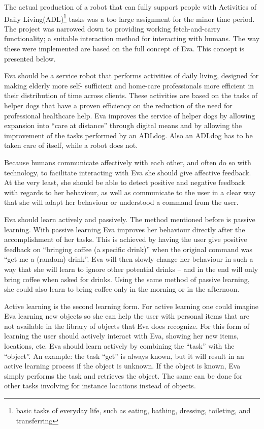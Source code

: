 \documentclass[project_eva.tex]{subfiles}
\begin{document}
The actual production of a robot that can fully support people with Activities of Daily Living(ADL)\footnote{basic tasks of everyday life, such as eating, bathing, dressing, toileting, and transferring}  tasks was a too large assignment for the minor time period. The project was narrowed down to providing working fetch-and-carry functionality; a suitable interaction method for interacting with humans. The way these were implemented are based on the full concept of Eva. This concept is presented below.

Eva should be a service robot that performs activities of daily living, designed for making elderly more self-
sufficient\cite{Forlizzi} and home-care professionals more efficient in their distribution of time across clients. These 
activities are based on the tasks of helper dogs that have a proven efficiency on the reduction of the need for 
professional healthcare help\cite{Diepenhorst}. Eva improves the service of helper dogs by allowing 
expansion into ``care at distance'' \cite{Evers} through digital means and by allowing the improvement of the tasks 
performed by an ADLdog. Also an ADLdog has to be taken care of itself, while a robot does not.

Because humans communicate affectively with each other, and often do so with technology, to facilitate interacting with Eva she should give affective feedback. At the very least, she should be able to detect positive and negative feedback with regards to her behaviour, as well as communicate to the user in a clear way that she will adapt her behaviour or understood a command from the user.

Eva should learn actively and passively. The method mentioned before is passive learning. With passive learning Eva 
improves her behaviour directly after the accomplishment of her tasks. This is achieved by having the user give positive 
feedback on ``bringing coffee (a specific drink)''  when the original command was ``get me a (random) drink''.  Eva will 
then slowly change her behaviour in such a way that she will learn to ignore other potential drinks – and in the end will 
only bring coffee when asked for drinks. Using the same method of passive learning, she could also learn to bring coffee 
only in the morning or in the afternoon.

\label{sec:Concept}
Active learning is the second learning form. For active learning one could imagine Eva learning new objects so 
she can help the user with personal items that are not available in the library of objects that Eva does recognize. 
For this form of learning the user should actively interact with Eva, showing her new items, locations, etc. Eva should 
learn actively by combining the ``task'' with the ``object''. An example: the task ``get'' is always known, but it will 
result in an active learning process if the object is unknown. If the object is known, Eva simply performs the task and 
retrieves the object. The same can be done for other tasks involving for instance locations instead of objects.
\end{document}
